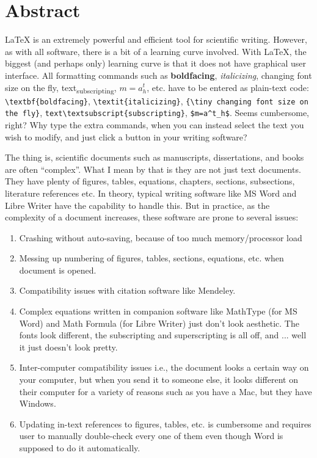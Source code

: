 \chapter*{Abstract}

\LaTeX{} is an extremely powerful and efficient tool for scientific writing. However, as with all software, there is a bit of a learning curve involved. With \LaTeX{}, the biggest (and perhaps only) learning curve is that it does not have graphical user interface. All formatting commands such as \textbf{boldfacing}, \textit{italicizing}, {\tiny changing font size on the fly}, text\textsubscript{subscripting}, $m=a^t_h$, etc. have to be entered as plain-text code: \verb|\textbf{boldfacing}|, \verb|\textit{italicizing}|, \verb|{\tiny changing font size on the fly}|, \verb|text\textsubscript{subscripting}|, \verb|$m=a^t_h$|. Seems cumbersome, right? Why type the extra commands, when you can instead select the text you wish to modify, and just click a button in your writing software?

The thing is, scientific documents such as manuscripts, dissertations, and books are often ``complex''. What I mean by that is they are not just text documents. They have plenty of figures, tables, equations, chapters, sections, subsections, literature references etc. In theory, typical writing software like MS Word and Libre Writer have the capability to handle this. But in practice, as the complexity of a document increases, these software are prone to several issues:

\begin{enumerate}
\item Crashing without auto-saving, because of too much memory/processor load
\item Messing up numbering of figures, tables, sections, equations, etc. when document is opened.
\item Compatibility issues with citation software like Mendeley.
\item Complex equations written in companion software like MathType (for MS Word) and Math Formula (for Libre Writer) just don't look aesthetic. The fonts look different, the subscripting and superscripting is all off, and ... well it just doesn't look pretty.
\item Inter-computer compatibility issues i.e., the document looks a certain way on your computer, but when you send it to someone else, it looks different on their computer for a variety of reasons such as you have a Mac, but they have Windows.
\item Updating in-text references to figures, tables, etc. is cumbersome and requires user to manually double-check every one of them even though Word is supposed to do it automatically.
\end{enumerate}

